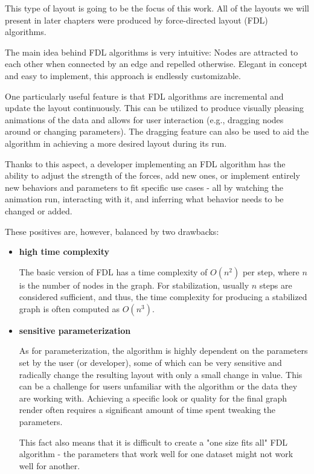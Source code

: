 This type of layout is going to be the focus of this work.
All of the layouts we will present in later chapters were produced by force-directed layout (FDL) algorithms.

The main idea behind FDL algorithms is very intuitive:
Nodes are attracted to each other when connected by an edge and repelled otherwise.
Elegant in concept and easy to implement, this approach is endlessly customizable.

One particularly useful feature is that FDL algorithms are incremental and update the layout continuously.
This can be utilized to produce visually pleasing animations of the data and allows for user interaction
(e.g., dragging nodes around or changing parameters).
The dragging feature can also be used to aid the algorithm in achieving a more desired layout during its run.

Thanks to this aspect, a developer implementing an FDL algorithm has the ability to adjust the strength of the forces, add new ones,
or implement entirely new behaviors and parameters to fit specific use cases 
- all by watching the animation run, interacting with it, and inferring what behavior needs to be changed or added.

These positives are, however, balanced by two drawbacks:
\begin{itemize}
    \item \textbf{high time complexity}

 The basic version of FDL has a time complexity of $O(n^2)$ per step, where $n$ is the number of nodes in the graph.
 For stabilization, usually $n$ steps are considered sufficient,
 and thus, the time complexity for producing a stabilized graph is often computed as $O(n^3)$.

    \item \textbf{sensitive parameterization}
    
 As for parameterization, the algorithm is highly dependent on the parameters set by the user (or developer),
 some of which can be very sensitive and radically change the resulting layout with only a small change in value.
 This can be a challenge for users unfamiliar with the algorithm or the data they are working with.
 Achieving a specific look or quality for the final graph render often requires a significant amount of time spent tweaking the parameters.

 This fact also means that it is difficult to create a "one size fits all" FDL algorithm
 - the parameters that work well for one dataset might not work well for another.
\end{itemize}